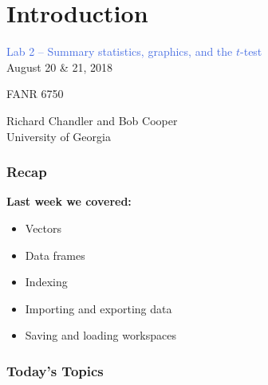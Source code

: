 \documentclass[color=usenames,dvipsnames]{beamer}\usepackage[]{graphicx}\usepackage[]{color}
\begin{document}



\section{Introduction}



\begin{frame}
  \LARGE
  \centering \par
  \textcolor{RoyalBlue}{\huge %
    Lab 2 -- Summary statistics,
    graphics, and the $t$-test} \\
  \vspace{1cm}
  August 20 \& 21, 2018 \par
  FANR 6750 \par
  \vfill
  \large
  Richard Chandler and Bob Cooper \\
  University of Georgia \\
\end{frame}




\begin{frame}[plain]
  \frametitle{Recap}
  \Large
  {\bf Last week we covered:}
  \begin{itemize}
    \item Vectors
    \item Data frames
    \item Indexing
    \item Importing and exporting data
    \item Saving and loading workspaces
  \end{itemize}
\end{frame}






\begin{frame}[plain]
  \frametitle{Today's Topics}
  \Large
\end{frame}
\end{document}
